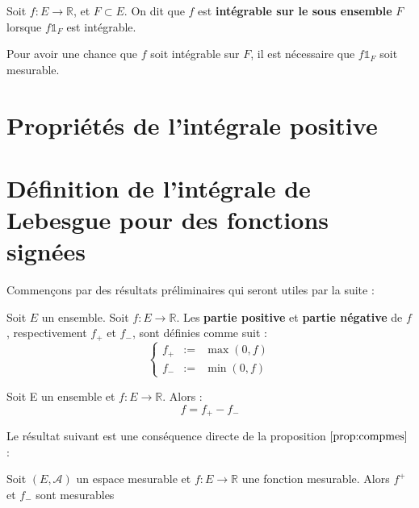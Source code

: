 \documentclass[../integ-proba.tex]{subfiles}
\begin{document}
  \begin{defi}
    Soit $f:E\longrightarrow\mathbb{R}$, et $F\subset E$.
    On dit que $f$ est \textbf{intégrable sur le sous ensemble} $F$ lorsque $f\mathds{1}_F$ est intégrable.
  \end{defi}

  \begin{rem}
    Pour avoir une chance que $f$ soit intégrable sur $F$, il est nécessaire que $f\mathds{1}_F$ soit mesurable.
  \end{rem}

  \section{Propriétés de l'intégrale positive}


  \section{Définition de l'intégrale de Lebesgue pour des fonctions signées}

  Commençons par des résultats préliminaires qui seront utiles par la suite :

  \begin{defi}
    \label{def:partieposneg}
    Soit $E$ un ensemble.
    Soit $f:E\longrightarrow\mathbb{R}$.
    Les \textbf{partie positive} et \textbf{partie négative} de $f$, respectivement $f_+$ et $f_-$, sont définies comme suit :
    $$
    \left\{
      \begin{array}{rcl}
        f_+&:=&\max(0,f)\\
        f_-&:=&\min(0,f)
      \end{array}
    \right.
    $$
  \end{defi}

  \begin{prop}
    Soit E un ensemble et $f:E\longrightarrow\mathbb{R}$.
    Alors :
    $$
    f = f_+ - f_-
    $$
  \end{prop}

  Le résultat suivant est une conséquence directe de la proposition $\ref{prop:compmes}$ :

  \begin{prop}
    \label{prop:partiemes}
    Soit $\left(E,\mathcal{A}\right)$ un espace mesurable et $f:E\longrightarrow\mathbb{R}$ une fonction mesurable.
    Alors $f^+$ et $f_-$ sont mesurables
  \end{prop}
\end{document}
